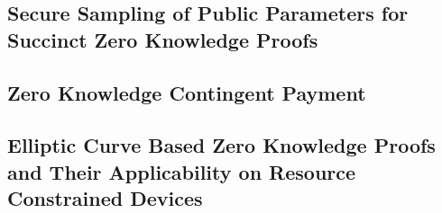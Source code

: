 \subsection{Secure Sampling of Public Parameters for Succinct Zero Knowledge Proofs\cite{ben2015secure}}


\subsection{Zero Knowledge Contingent Payment\cite{wiki2011zero}}


\subsection{Elliptic Curve Based Zero Knowledge Proofs and Their Applicability on Resource Constrained Devices\cite{ecc2011}}


